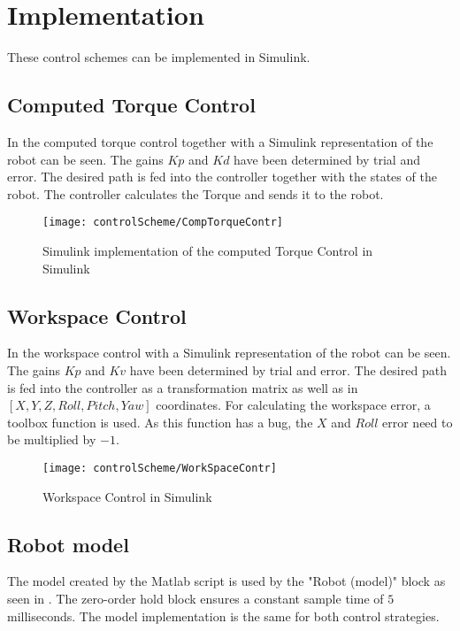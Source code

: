 \section{Implementation}

These control schemes can be implemented in Simulink.  

\subsection{Computed Torque Control}
In  the computed torque control together with a Simulink representation of the robot can be seen. 
The gains $Kp$ and $Kd$ have been determined by trial and error. 
The desired path is fed into the controller together with the states of the robot. The controller calculates the Torque and sends it to the robot.


\begin{figure}[H]
	\texttt{[image: controlScheme/CompTorqueContr]}
	\caption{Simulink implementation of the computed Torque Control in Simulink}
	\label{fig:CompTorqueContr}
\end{figure}



\subsection{Workspace Control}
In  the workspace control with a Simulink representation of the robot can be seen.
The gains $Kp$ and $Kv$ have been determined by trial and error.
The desired path is fed into the controller as a transformation matrix as well as in $[X,Y,Z,Roll,Pitch,Yaw]$ coordinates.
For calculating the workspace error, a toolbox function is used. As this function has a bug, the $X$ and $Roll$ error need to be multiplied by $-1$.

\begin{figure}[H]
	\texttt{[image: controlScheme/WorkSpaceContr]}
	\caption{Workspace Control in Simulink}
	\label{fig:WorkSpaceContr}
\end{figure}


\subsection{Robot model}
The model created by the Matlab script is used by the "Robot (model)" block as seen in . The zero-order hold block ensures a constant sample time of $5$ milliseconds. The model implementation is the same for both control strategies.

